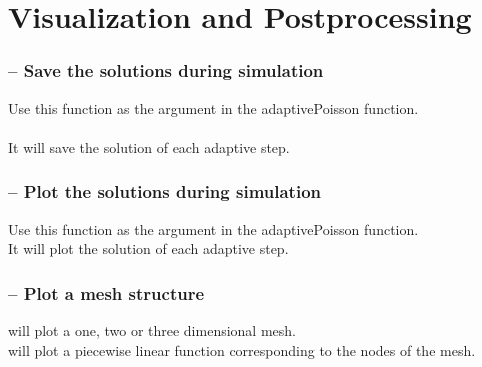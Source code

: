 \documentclass[twoside,11pt,a4paper]{article} %
\begin{document}
\section{Visualization and Postprocessing}
\subsubsection*{\texorpdfstring{ --}{} Save the solutions during simulation}
Use this function as the  argument in the adaptivePoisson function. \\
 \\
It will save the solution of each adaptive step.
\subsubsection*{\texorpdfstring{ --}{} Plot the solutions during simulation}
Use this function as the  argument in the adaptivePoisson function.\\
It will plot the solution of each adaptive step.
\subsubsection*{\texorpdfstring{ --}{} Plot a mesh structure}
 will plot a one, two or three dimensional mesh. \\
 will plot a piecewise linear function  corresponding to the nodes of the mesh.




\end{document}
